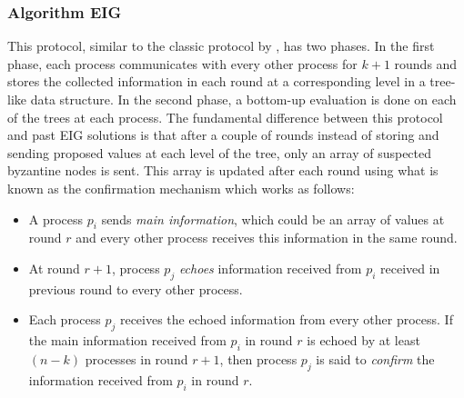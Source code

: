 \subsubsection{Algorithm EIG}
This protocol, similar to the classic protocol by \cite{Bar-NoyD91}, has two phases. In the first phase, each process communicates with every other process for $k + 1$ rounds and stores the collected information in each round at a corresponding level in a tree-like data structure. In the second phase, a bottom-up evaluation is done on each of the trees at each process. The fundamental difference between this protocol and past EIG solutions is that after a couple of rounds instead of storing and sending proposed values at each level of the tree, only an array of suspected byzantine nodes is sent. This array is updated after each round using what is known as the confirmation mechanism which works as follows:
\begin{itemize}
\item A process $p_i$ sends \textit{main information}, which could be an array of values at round $r$ and every other process receives this information in the same round.
\item At round $r+1$, process $p_j$ \textit{echoes} information received from $p_i$ received in previous round to every other process. 
\item Each process $p_j$ receives the echoed information from every other process. If the main information received from $p_i$ in round $r$ is echoed by at least $(n - k)$ processes in round $r+1$, then process $p_j$ is said to \textit{confirm} the information received from $p_i$ in round $r$.
    \end{itemize}


